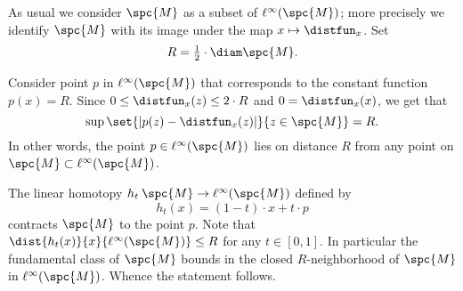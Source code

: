 As usual we consider $\spc{M}$ as a subset of $\ell^\infty(\spc{M})$;
more precisely we identify $\spc{M}$ with its image under the map  $x\mapsto \distfun_x$.
Set 
\[R=\tfrac12\cdot\diam\spc{M}.\]

Consider point $p$ in $\ell^\infty(\spc{M})$ that corresponds to the constant function $p(x)=R$.
Since $0\le \distfun_x(z)\le  2\cdot R$ and $0=\distfun_x(x)$, we get that
\[\sup\set{|p(z)-\distfun_x(z)|}{z\in\spc{M}}=R.\]
In other words, the point $p\in \ell^\infty(\spc{M})$ lies on distance $R$ from any point on $\spc{M}\subset \ell^\infty(\spc{M})$.

The linear homotopy $h_t\:\spc{M}\to \ell^\infty(\spc{M})$ defined by
\[h_t(x)=(1-t)\cdot x+t\cdot p\]
contracts $\spc{M}$ to the point $p$.
Note that $\dist{h_t(x)}{x}{\ell^\infty(\spc{M})}\le R$ for any $t\in[0,1]$.
In particular the fundamental class of $\spc{M}$ bounds in the closed $R$-neighborhood of $\spc{M}$ in $\ell^\infty(\spc{M})$.
Whence the statement follows.








